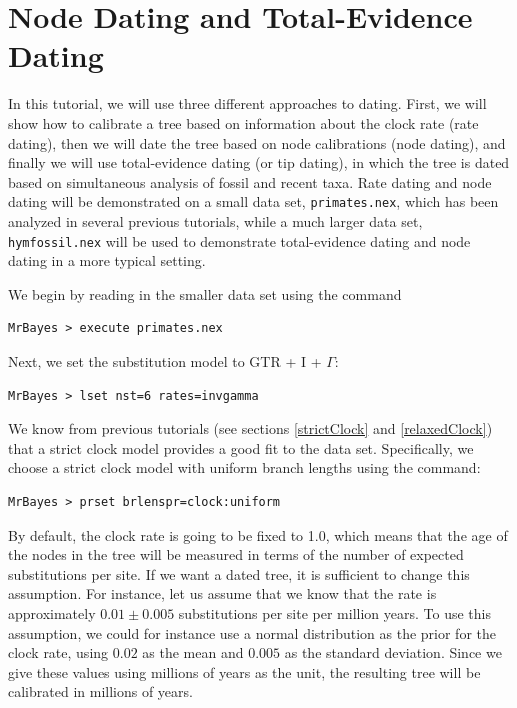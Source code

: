 \documentclass[12pt]{book}
\begin{document}
\section{Node Dating and Total-Evidence Dating}

In this tutorial, we will use three different approaches to dating. First, we will show how to calibrate a tree based
on information about the clock rate (rate dating), then we will date the tree based on node calibrations (node dating),
and finally we will use total-evidence dating (or tip dating), in which the tree is dated based on simultaneous analysis
of fossil and recent taxa. Rate dating and node dating will be demonstrated on a small data set, \texttt{primates.nex},
which has been analyzed in several previous tutorials, while a much larger data set, \texttt{hymfossil.nex} will be
used to demonstrate total-evidence dating and node dating in a more typical setting.

We begin by reading in the smaller data set using the command

\begin{verbatim}
MrBayes > execute primates.nex
\end{verbatim}

Next, we set the substitution model to GTR + I + $\Gamma$:

\begin{verbatim}
MrBayes > lset nst=6 rates=invgamma
\end{verbatim}

We know from previous tutorials (see sections \ref{strictClock} and \ref{relaxedClock}) that a strict clock model
provides a good fit to the data set. Specifically, we choose a strict clock model with uniform branch lengths
using the command:

\begin{verbatim}
MrBayes > prset brlenspr=clock:uniform
\end{verbatim}

By default, the clock rate is going to be fixed to 1.0, which means that the age of the nodes in the tree will be
measured in terms of the number of expected substitutions per site. If we want a dated tree, it is sufficient to
change this assumption. For instance, let us assume that we know that the rate is approximately $0.01 \pm 0.005$
substitutions per site per million years. To use this assumption, we could for instance use a normal distribution
as the prior for the clock rate, using $0.02$ as the mean and $0.005$ as the standard deviation. Since we give
these values using millions of years as the unit, the resulting tree will be calibrated in millions of years.
\end{document}

